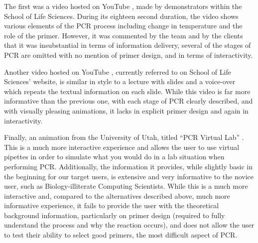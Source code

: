 The first was a video hosted on YouTube \cite{youtube:taqExtension},
made by demonstrators within the School of Life Sciences.
During its eighteen second duration, the video shows various elements
of the PCR process including change in temperature and the role of the
primer.
However, it was commented by the team and by the clients that it was
insubstantial in terms of information delivery, several of the stages
of PCR are omitted with no mention of primer design, and in terms
of interactivity.

Another video hosted on YouTube \cite{youtube:PCR}, currently referred
to on School of Life Sciences' website, is similar in style to a
lecture with slides and a voice-over which repeats the textual
information on each slide.
While this video is far more informative than the previous one, with
each stage of PCR clearly described, and with visually pleasing
animations, it lacks in explicit primer design and again in
interactivity.

Finally, an animation from the University of Utah, titled ``PCR
Virtual Lab'' \cite{genScienceCenter2012}.
This is a much more interactive experience and allows the user to use
virtual pipettes in order to simulate what you would do in a lab
situation when performing PCR.
Additionally, the information it provides, while slightly basic in the
beginning for our target users, is extensive and very informative to
the novice user, such as Biology-illiterate Computing Scientists.
While this is a much more interactive and, compared to the
alternatives described above, much more informative experience, it
fails to provide the user with the theoretical background information,
particularly on primer design (required to fully understand the
process and why the reaction occurs), and does not allow the user to
test their ability to select good primers, the most difficult aspect
of PCR.																									%

